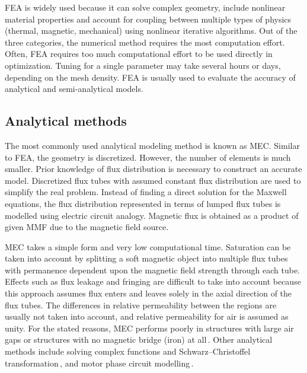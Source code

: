         \acs{FEA} is widely used because it can solve complex geometry, include nonlinear material properties and account for coupling between multiple types of physics (thermal, magnetic, mechanical) using nonlinear iterative algorithms. Out of the three categories, the numerical method requires the most computation effort. Often, \acs{FEA} requires too much computational effort to be used directly in optimization. Tuning for a single parameter may take several hours or days, depending on the mesh density. \acs{FEA} is usually used to evaluate the accuracy of analytical and semi-analytical models.

    
    \subsection{Analytical methods}                 \label{Chapter:background/modelling techniques for designing motors/analytical methods}
    
    
        The most commonly used analytical modeling method is known as \ac{MEC}. Similar to \acs{FEA}, the geometry is discretized. However, the number of elements is much smaller. Prior knowledge of flux distribution is necessary to construct an accurate model. Discretized flux tubes with assumed constant flux distribution are used to simplify the real problem. Instead of finding a direct solution for the Maxwell equations, the flux distribution represented in terms of lumped flux tubes is modelled using electric circuit analogy. Magnetic flux is obtained as a product of given \ac{MMF} due to the magnetic field source.  
        
        \acs{MEC} takes a simple form and very low computational time. Saturation can be taken into account by splitting a soft magnetic object into multiple flux tubes with permanence dependent upon the magnetic field strength through each tube. Effects such as flux leakage and fringing are difficult to take into account because this approach assumes flux enters and leaves solely in the axial direction of the flux tubes. The differences in relative permeability between the regions are usually not taken into account, and relative permeability for air is assumed as unity. For the stated reasons, \acs{MEC} performs poorly in structures with large air gaps or structures with no magnetic bridge (iron) at all\,\cite{DeBoeij2006ModelingStructures}. Other analytical methods include solving complex functions and Schwarz–Christoffel transformation\,\cite{Zarko2006AnalyticalPermeance}, and motor phase circuit modelling\,\cite{Proca2003AnalyticalMagnets}.
        
